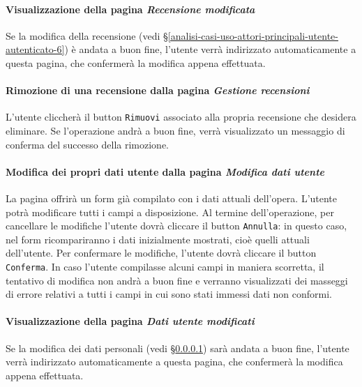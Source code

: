\paragraph{Visualizzazione della pagina \textit{Recensione modificata}}
\label{analisi-casi-uso-attori-principali-utente-autenticato-8}
Se la modifica della recensione (vedi §\ref{analisi-casi-uso-attori-principali-utente-autenticato-6}) è andata a buon fine, l'utente verrà indirizzato automaticamente a questa pagina, che confermerà la modifica appena effettuata.


\paragraph{Rimozione di una recensione dalla pagina \textit{Gestione recensioni}}
\label{analisi-casi-uso-attori-principali-utente-autenticato-9}
L'utente cliccherà il button \texttt{Rimuovi} associato alla propria recensione che desidera eliminare. Se l'operazione andrà a buon fine, verrà visualizzato un messaggio di conferma del successo della rimozione.


\paragraph{Modifica dei propri dati utente dalla pagina \textit{Modifica dati utente}}
\label{analisi-casi-uso-attori-principali-utente-autenticato-10}
La pagina offrirà un form già compilato con i dati attuali dell'opera. L'utente potrà modificare tutti i campi a disposizione. Al termine dell'operazione, per cancellare le modifiche l'utente dovrà cliccare il button \texttt{Annulla}: in questo caso, nel form ricompariranno i dati inizialmente mostrati, cioè quelli attuali dell'utente. Per confermare le modifiche, l'utente dovrà cliccare il button \texttt{Conferma}. In caso l'utente compilasse alcuni campi in maniera scorretta, il tentativo di modifica non andrà a buon fine e verranno visualizzati dei masseggi di errore relativi a tutti i campi in cui sono stati immessi dati non conformi.


\paragraph{Visualizzazione della pagina \textit{Dati utente modificati}}
\label{analisi-casi-uso-attori-principali-utente-autenticato-11}
Se la modifica dei dati personali (vedi §\ref{analisi-casi-uso-attori-principali-utente-autenticato-8}) sarà andata a buon fine, l'utente verrà indirizzato automaticamente a questa pagina, che confermerà la modifica appena effettuata.



